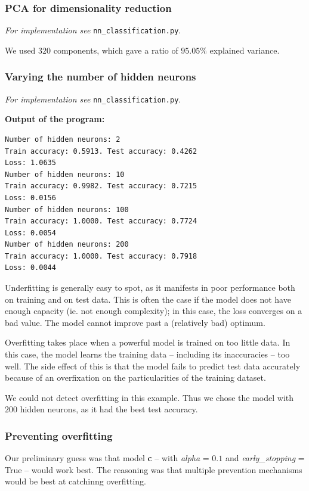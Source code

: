     \subsubsection{PCA for dimensionality reduction}
    \textit{For implementation see } \texttt{nn\_classification.py}.

    We used $320$ components, which gave a ratio of $95.05\%$ explained variance.

    \subsubsection{Varying the number of hidden neurons}
    \textit{For implementation see } \texttt{nn\_classification.py}.

    \textbf{Output of the program:}
    \begin{lstlisting}
Number of hidden neurons: 2
Train accuracy: 0.5913. Test accuracy: 0.4262
Loss: 1.0635
Number of hidden neurons: 10
Train accuracy: 0.9982. Test accuracy: 0.7215
Loss: 0.0156
Number of hidden neurons: 100
Train accuracy: 1.0000. Test accuracy: 0.7724
Loss: 0.0054
Number of hidden neurons: 200
Train accuracy: 1.0000. Test accuracy: 0.7918
Loss: 0.0044
    \end{lstlisting}

    Underfitting is generally easy to spot, as it manifests in poor performance both on training and on test data.
    This is often the case if the model does not have enough capacity (ie. not enough complexity); in this case, the loss converges on a bad value.
    The model cannot improve past a (relatively bad) optimum.

    Overfitting takes place when a powerful model is trained on too little data.
    In this case, the model learns the training data -- including its inaccuracies -- too well.
    The side effect of this is that the model fails to predict test data accurately because of an overfixation on the particularities of the training dataset.

    We could not detect overfitting in this example.
    Thus we chose the model with $200$ hidden neurons, as it had the best test accuracy.

    \subsubsection{Preventing overfitting}
    Our preliminary guess was that model \textbf{c} -- with \textit{alpha} = $0.1$ and \textit{early\_stopping} = True -- would work best.
    The reasoning was that multiple prevention mechanisms would be best at catchinng overfitting.

